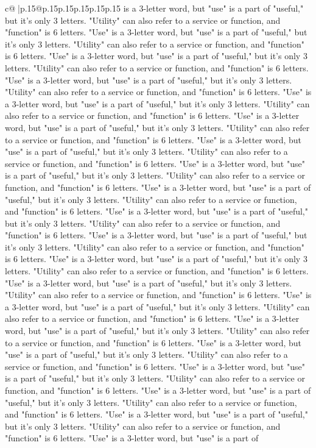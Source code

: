 \documentclass{article}
\begin{document}
{\begin{supertabular}{c@{$\;$}|p{.15\linewidth}@{}p{.15\linewidth}p{.15\linewidth}p{.15\linewidth}p{.15\linewidth}p{.15\linewidth}}
{{{is a 3{-}letter word, but "use" is a part of "useful," but it's only 3 letters. "Utility" can also refer to a service or function, and "function" is 6 letters. "Use" is a 3{-}letter word, but "use" is a part of "useful," but it's only 3 letters. "Utility" can also refer to a service or function, and "function" is 6 letters. "Use" is a 3{-}letter word, but "use" is a part of "useful," but it's only 3 letters. "Utility" can also refer to a service or function, and "function" is 6 letters. "Use" is a 3{-}letter word, but "use" is a part of "useful," but it's only 3 letters. "Utility" can also refer to a service or function, and "function" is 6 letters. "Use" is a 3{-}letter word, but "use" is a part of "useful," but it's only 3 letters. "Utility" can also refer to a service or function, and "function" is 6 letters. "Use" is a 3{-}letter word, but "use" is a part of "useful," but it's only 3 letters. "Utility" can also refer to a service or function, and "function" is 6 letters. "Use" is a 3{-}letter word, but "use" is a part of "useful," but it's only 3 letters. "Utility" can also refer to a service or function, and "function" is 6 letters. "Use" is a 3{-}letter word, but "use" is a part of "useful," but it's only 3 letters. "Utility" can also refer to a service or function, and "function" is 6 letters. "Use" is a 3{-}letter word, but "use" is a part of "useful," but it's only 3 letters. "Utility" can also refer to a service or function, and "function" is 6 letters. "Use" is a 3{-}letter word, but "use" is a part of "useful," but it's only 3 letters. "Utility" can also refer to a service or function, and "function" is 6 letters. "Use" is a 3{-}letter word, but "use" is a part of "useful," but it's only 3 letters. "Utility" can also refer to a service or function, and "function" is 6 letters. "Use" is a 3{-}letter word, but "use" is a part of "useful," but it's only 3 letters. "Utility" can also refer to a service or function, and "function" is 6 letters. "Use" is a 3{-}letter word, but "use" is a part of "useful," but it's only 3 letters. "Utility" can also refer to a service or function, and "function" is 6 letters. "Use" is a 3{-}letter word, but "use" is a part of "useful," but it's only 3 letters. "Utility" can also refer to a service or function, and "function" is 6 letters. "Use" is a 3{-}letter word, but "use" is a part of "useful," but it's only 3 letters. "Utility" can also refer to a service or function, and "function" is 6 letters. "Use" is a 3{-}letter word, but "use" is a part of "useful," but it's only 3 letters. "Utility" can also refer to a service or function, and "function" is 6 letters. "Use" is a 3{-}letter word, but "use" is a part of "useful," but it's only 3 letters. "Utility" can also refer to a service or function, and "function" is 6 letters. "Use" is a 3{-}letter word, but "use" is a part of "useful," but it's only 3 letters. "Utility" can also refer to a service or function, and "function" is 6 letters. "Use" is a 3{-}letter word, but "use" is a part of "useful," but it's only 3 letters. "Utility" can also refer to a service or function, and "function" is 6 letters. "Use" is a 3{-}letter word, but "use" is a part of }}}
\end{supertabular}}
\end{document}
